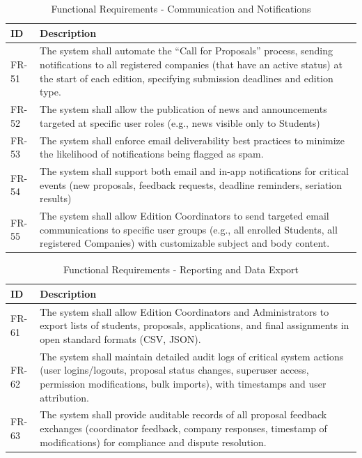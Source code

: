 {
    \begin{table}[H]
        \centering
        \caption{Functional Requirements - Communication and Notifications}
        \begin{tabular}{|l|p{12cm}|} %
            \hline
            \textbf{ID} & \textbf{Description} \\ \hline
            FR-51 & The system shall automate the “Call for Proposals” process, sending notifications to all registered companies (that have an active status) at the start of each edition, specifying submission deadlines and edition type. \\ \hline
            FR-52 & The system shall allow the publication of news and announcements targeted at specific user roles (e.g., news visible only to Students) \\ \hline
            FR-53 & The system shall enforce email deliverability best practices to minimize the likelihood of notifications being flagged as spam. \\ \hline
            FR-54 & The system shall support both email and in-app notifications for critical events (new proposals, feedback requests, deadline reminders, seriation results) \\ \hline
            FR-55 & The system shall allow Edition Coordinators to send targeted email communications to specific user groups (e.g., all enrolled Students, all registered Companies) with customizable subject and body content. \\ \hline
        \end{tabular}   
    \end{table}    
}

{
    \begin{table}[H]
        \centering
        \caption{Functional Requirements - Reporting and Data Export}
        \begin{tabular}{|l|p{12cm}|} %
            \hline
            \textbf{ID} & \textbf{Description} \\ \hline
            FR-61 & The system shall allow Edition Coordinators and Administrators to export lists of students, proposals, applications, and final assignments in open standard formats (CSV, JSON). \\ \hline
            FR-62 & The system shall maintain detailed audit logs of critical system actions (user logins/logouts, proposal status changes, superuser access, permission modifications, bulk imports), with timestamps and user attribution. \\ \hline
            FR-63 & The system shall provide auditable records of all proposal feedback exchanges (coordinator feedback, company responses, timestamp of modifications) for compliance and dispute resolution. \\ \hline
        \end{tabular}
    \end{table}    
}

